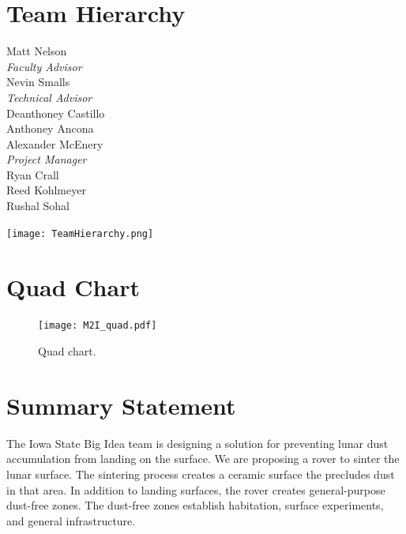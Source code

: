 \documentclass[10pt]{article}
\begin{document}
\section{Team Hierarchy}
\centering
\begin{multicols}{2}\large{
    Matt Nelson             \\\emph{Faculty Advisor}\\[0.7 cm]
    Nevin Smalls            \\\emph{Technical Advisor}\\[0.5 cm]
    Deanthoney Castillo     \\[0.5 cm]
    Anthoney Ancona         \\[0.5 cm]
    Alexander McEnery       \\\emph{Project Manager}\\[0.7 cm]
    Ryan Crall              \\[0.5 cm]
    Reed Kohlmeyer          \\[0.5 cm]
    Rushal Sohal            \\[0.5 cm]
    
    
}\end{multicols}

\texttt{[image: TeamHierarchy.png]}\\[0.35 cm]



\newpage
\tableofcontents
\newpage

\section{Quad Chart}
    
\begin{figure}[H]
\begin{center}
\texttt{[image: M2I\_quad.pdf]}
\caption{Quad chart.}
\label{1.fig}
\end{center}
\end{figure}

\newpage

\section{Summary Statement}\justifying

The Iowa State Big Idea team is designing a solution for preventing lunar dust accumulation from landing on the surface. We are proposing a rover to sinter the lunar surface. The sintering process creates a ceramic surface the precludes dust in that area. In addition to landing surfaces, the rover creates general-purpose dust-free zones. The dust-free zones establish habitation, surface experiments, and general infrastructure.
\end{document}
